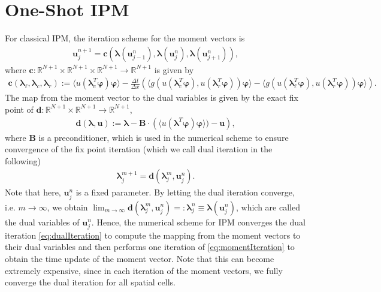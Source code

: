 \documentclass[10pt, a4paper, titlepage, bibliography=totocnumbered]{article}
\begin{document}
\section*{One-Shot IPM}
For classical IPM, the iteration scheme for the moment vectors is
\begin{align}\label{eq:momentIteration}
\bm{u}_j^{n+1} = \bm{c}\left(\bm{\lambda}(\bm{u}_{j-1}^n),\bm{\lambda}(\bm{u}_{j}^n),\bm{\lambda}(\bm{u}_{j+1}^n)\right),
\end{align}
where $\bm{c}:\mathbb{R}^{N+1}\times\mathbb{R}^{N+1}\times\mathbb{R}^{N+1}\to\mathbb{R}^{N+1}$ is given by
\begin{align*}
\bm{c}\left(\bm{\lambda}_{\ell},\bm{\lambda}_c,\bm{\lambda}_r\right):= \langle u(\bm{\lambda}_c^T\bm{\varphi})\bm{\varphi}\rangle - \frac{\Delta t}{\Delta x}\left(\langle g(u(\bm{\lambda}_c^T\bm{\varphi}),u(\bm{\lambda}_r^T\bm{\varphi}))\bm{\varphi}\rangle-\langle g(u(\bm{\lambda}_{\ell}^T\bm{\varphi}),u(\bm{\lambda}_r^T\bm{\varphi}))\bm{\varphi}\rangle\right).
\end{align*}
The map from the moment vector to the dual variables is given by the exact fix point of $\bm{d}:\mathbb{R}^{N+1}\times\mathbb{R}^{N+1}\to\mathbb{R}^{N+1}$,
\begin{align*}
\bm{d}(\bm{\lambda},\bm{u}):= \bm{\lambda}-\bm{B}\cdot \left(\langle u(\bm{\lambda}^T\bm{\varphi})\bm{\varphi}\rangle)-\bm{u}\right),
\end{align*}
where $\bm{B}$ is a preconditioner, which is used in the numerical scheme to ensure convergence of the fix point iteration (which we call dual iteration in the following)
\begin{align}\label{eq:dualIteration}
\bm{\lambda}_j^{m+1} = \bm{d}(\bm{\lambda}_j^m,\bm{u}_j^{n}).
\end{align}
Note that here, $\bm{u}_j^{n}$ is a fixed parameter. By letting the dual iteration converge, i.e. $m\rightarrow\infty$, we obtain $\lim_{m\rightarrow\infty}\bm{d}(\bm{\lambda}_j^m,\bm{u}_j^{n}) =:\bm{\lambda}_j^{n} \equiv \bm\lambda(\bm{u}_j^{n})$, which are called the dual variables of $\bm{u}_j^{n}$. Hence, the numerical scheme for IPM converges the dual iteration \eqref{eq:dualIteration} to compute the mapping from the moment vectors to their dual variables and then performs one iteration of \eqref{eq:momentIteration} to obtain the time update of the moment vector. Note that this can become extremely expensive, since in each iteration of the moment vectors, we fully converge the dual iteration for all spatial cells.
\end{document}
